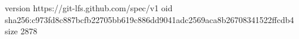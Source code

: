 version https://git-lfs.github.com/spec/v1
oid sha256:c973fd8c887bcfb22705bb619c886dd9041adc2569aca8b26708341522ffcdb4
size 2878
